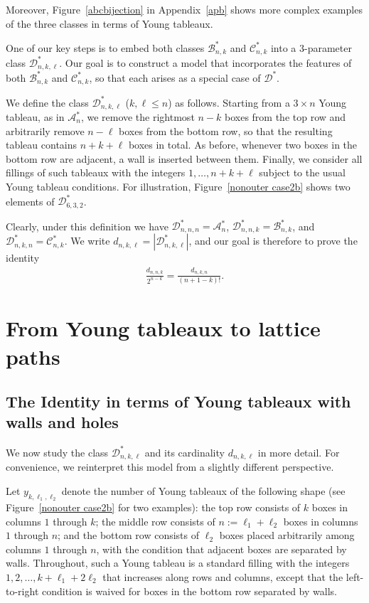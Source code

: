 \documentclass[a4paper,UKenglish,cleveref, autoref, thm-restate]{lipics-v2021}
\begin{document}
Moreover, Figure~\ref{abcbijection} in Appendix~\ref{apb} shows more complex examples of the three classes in terms of Young tableaux.

One of our key steps is to embed both classes $\mathcal{B}^*_{n,k}$ and $\mathcal{C}^*_{n,k}$ into a $3$-parameter class $\mathcal{D}^*_{n,k,\ell}$.
Our goal is to construct a model that incorporates the features of both $\mathcal{B}^*_{n,k}$ and $\mathcal{C}^*_{n,k}$, so that each arises as a special case of $\mathcal{D}^*$. 

We define the class $\mathcal{D}^*_{n,k,\ell}$ ($k,\ell \le n$) as follows. Starting from a $3\times n$ Young tableau, as in $\mathcal{A}^*_n$, we remove the rightmost $n-k$ boxes from the top row and arbitrarily remove $n-\ell$ boxes from the bottom row, so that the resulting tableau contains $n+k+\ell$ boxes in total. As before, whenever two boxes in the bottom row are adjacent, a wall is inserted between them. Finally, we consider all fillings of such tableaux with the integers $1,\dots,n+k+\ell$ subject to the usual Young tableau conditions. 
For illustration, Figure~\ref{nonouter case2b} shows two elements of $\mathcal{D}^*_{6,3,2}$.

Clearly, under this definition we have $\mathcal{D}^*_{n,n,n}=\mathcal{A}^*_n$, $\mathcal{D}^*_{n,n,k}=\mathcal{B}^*_{n,k}$, and $\mathcal{D}^*_{n,k,n}=\mathcal{C}^*_{n,k}$. We write $d_{n,k,\ell}=|\mathcal{D}^*_{n,k,\ell}|$, and our goal is therefore to prove the identity
\begin{align*}
\frac{d_{n,n,k}}{2^{n-k}} = \frac{d_{n,k,n}}{(n+1-k)!}.
\end{align*}

\section{From Young tableaux to lattice paths}

\subsection{The Identity in terms of Young tableaux with walls and holes}

We now study the class $\mathcal{D}^*_{n,k,\ell}$ and its cardinality $d_{n,k,\ell}$ in more detail. For convenience, we reinterpret this model from a slightly different perspective.
 
Let $y_{k,\ell_1,\ell_2}$ denote the number of Young tableaux of the following shape (see Figure~\ref{nonouter case2b} for two examples): the top row consists of $k$ boxes in columns $1$ through $k$; the middle row consists of $n := \ell_1 + \ell_2$ boxes in columns $1$ through $n$; and the bottom row consists of $\ell_2$ boxes placed arbitrarily among columns $1$ through $n$, with the condition that adjacent boxes are separated by walls. 
Throughout, such a Young tableau is a standard filling with the integers $1,2,\dots,k+\ell_1+2\ell_2$ that increases along rows and columns, except that the left-to-right condition is waived for boxes in the bottom row separated by walls.
\end{document}
